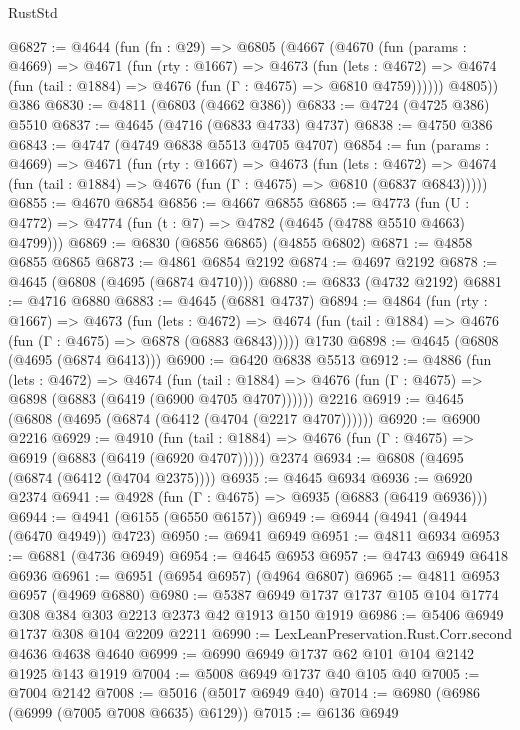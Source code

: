 \begin{lexlean}{RustStd}
\begin{coremodule}
@6827 := @4644
    (fun (fn : @29) =>
    @6805
      (@4667
        (@4670
          (fun (params : @4669) =>
          @4671
            (fun (rty : @1667) =>
            @4673
              (fun (lets : @4672) =>
              @4674 (fun (tail : @1884) => @4676 (fun (Γ : @4675) => @6810 @4759))))))
        @4805))
    @386
@6830 := @4811 (@6803 (@4662 @386))
@6833 := @4724 (@4725 @386) @5510
@6837 := @4645 (@4716 (@6833 @4733) @4737)
@6838 := @4750 @386
@6843 := @4747 (@4749 @6838 @5513 @4705 @4707)
@6854 := fun (params : @4669) =>
  @4671
    (fun (rty : @1667) =>
    @4673
      (fun (lets : @4672) =>
      @4674 (fun (tail : @1884) => @4676 (fun (Γ : @4675) => @6810 (@6837 @6843)))))
@6855 := @4670 @6854
@6856 := @4667 @6855
@6865 := @4773 (fun (U : @4772) => @4774 (fun (t : @7) => @4782 (@4645 (@4788 @5510 @4663) @4799)))
@6869 := @6830 (@6856 @6865) (@4855 @6802)
@6871 := @4858 @6855 @6865
@6873 := @4861 @6854 @2192
@6874 := @4697 @2192
@6878 := @4645 (@6808 (@4695 (@6874 @4710)))
@6880 := @6833 (@4732 @2192)
@6881 := @4716 @6880
@6883 := @4645 (@6881 @4737)
@6894 := @4864
    (fun (rty : @1667) =>
    @4673
      (fun (lets : @4672) =>
      @4674 (fun (tail : @1884) => @4676 (fun (Γ : @4675) => @6878 (@6883 @6843)))))
    @1730
@6898 := @4645 (@6808 (@4695 (@6874 @6413)))
@6900 := @6420 @6838 @5513
@6912 := @4886
    (fun (lets : @4672) =>
    @4674
      (fun (tail : @1884) => @4676 (fun (Γ : @4675) => @6898 (@6883 (@6419 (@6900 @4705 @4707))))))
    @2216
@6919 := @4645 (@6808 (@4695 (@6874 (@6412 (@4704 (@2217 @4707))))))
@6920 := @6900 @2216
@6929 := @4910
    (fun (tail : @1884) => @4676 (fun (Γ : @4675) => @6919 (@6883 (@6419 (@6920 @4707)))))
    @2374
@6934 := @6808 (@4695 (@6874 (@6412 (@4704 @2375))))
@6935 := @4645 @6934
@6936 := @6920 @2374
@6941 := @4928 (fun (Γ : @4675) => @6935 (@6883 (@6419 @6936)))
@6944 := @4941 (@6155 (@6550 @6157))
@6949 := @6944 (@4941 (@4944 (@6470 @4949)) @4723)
@6950 := @6941 @6949
@6951 := @4811 @6934
@6953 := @6881 (@4736 @6949)
@6954 := @4645 @6953
@6957 := @4743 @6949 @6418 @6936
@6961 := @6951 (@6954 @6957) (@4964 @6807)
@6965 := @4811 @6953 @6957 (@4969 @6880)
@6980 := @5387 @6949 @1737 @1737 @105 @104 @1774 @308 @384 @303 @2213 @2373 @42 @1913 @150 @1919
@6986 := @5406 @6949 @1737 @308 @104 @2209 @2211
@6990 := LexLeanPreservation.Rust.Corr.second @4636 @4638 @4640
@6999 := @6990 @6949 @1737 @62 @101 @104 @2142 @1925 @143 @1919
@7004 := @5008 @6949 @1737 @40 @105 @40
@7005 := @7004 @2142
@7008 := @5016 (@5017 @6949 @40)
@7014 := @6980 (@6986 (@6999 (@7005 @7008 @6635) @6129))
@7015 := @6136 @6949

\end{coremodule}
\end{lexlean}
